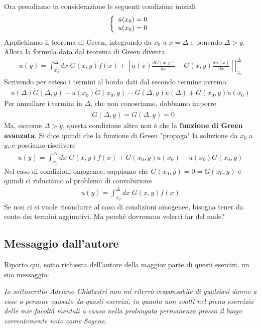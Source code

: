 Ora prendiamo in considerazione le seguenti condizioni iniziali
\begin{align}
	\left\{ \begin{array}{cc} \dot{u}(x_0)=0\\ u(x_0)=0 \end{array} \right.
\end{align}
Applichiamo il teorema di Green, integrando da $x_0$ a $x = \Delta$ e ponendo $\Delta > y$. 
Allora la formula data dal teorema di Green diventa
\begin{align}
	u(y) = \int_{x_0}^{\Delta} dx \; G(x,y) f(x) + \left.\left[ u(x) \frac{dG(x,y)}{dx} - G(x,y) \frac{du(x)}{dx} \right]\right|_{x_0}^\Delta
\end{align}
Scrivendo per esteso i termini al bordo dati dal secondo termine avremo
\begin{align}
	u(\Delta) \dot{G}(\Delta,y) - u(x_0) \dot{G}(x_0,y) - G(\Delta,y) \dot{u}(\Delta) + G(x_0,y) \dot{u}(x_0) 
\end{align}
Per annullare i termini in $\Delta$, che non conosciamo, dobbiamo imporre 
\begin{align}
	&\dot{G}(\Delta, y) = G(\Delta, y) = 0	
\end{align}
Ma, siccome $\Delta>y$, questa condizione altro non è che la \textbf{funzione di Green avanzata}. Si dice quindi che la funzione di Green "propaga" la soluzione da $x_0$ a $y$, e possiamo riscrivere
\begin{align}
	u(y) = \int_{x_0}^{\Delta} dx \; G(x,y) f(x) +  G(x_0,y) \dot{u}(x_0) - u(x_0) \dot{G}(x_0,y) 
\end{align}
Nel caso di condizioni omogenee, sappiamo che $G(x_0,y) = 0 = \dot{G}(x_0,y)$ e quindi ci riduciamo al problema di convoluzione
\begin{align}
	u(y) = \int_{x_0}^{\Delta} dx \; G(x,y) f(x)
\end{align}
Se non ci si vuole ricondurre al caso di condizioni omogenee, bisogna tener da conto dei termini aggiuntivi. Ma perché dovremmo volerci far del male?


\newpage

\subsection{Messaggio dall'autore}

Riporto qui, sotto richiesta dell'autore della maggior parte di questi esercizi, un suo messaggio:

\textit{Io sottoscritto Adriano Chialastri non mi riterrò responsabile di qualsiasi danno a cose o persone causato da questi esercizi, in quanto non svolti nel pieno esercizio delle mie facoltà mentali a causa nella prolungata permanenza presso il luogo correntemente noto come Sogene.
}

